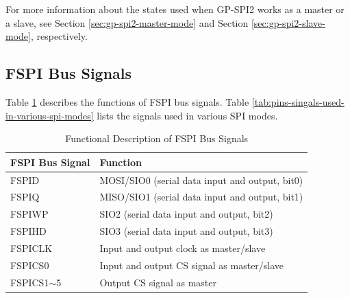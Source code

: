 \documentclass[main\_\_EN.tex]{subfiles}
\begin{document}
For more information about the states used when GP-SPI2 works as a master or a slave, see Section \ref{sec:gp-spi2-master-mode} and Section \ref{sec:gp-spi2-slave-mode}, respectively.

\subsection{FSPI Bus Signals}

Table \ref{tab:spi-signals} describes the functions of FSPI bus signals. Table \ref{tab:pins-singals-used-in-various-spi-modes} lists the signals used in various SPI modes. 


\begin{ThreePartTable}

\begin{longtable}[c]{|p{3.0cm}|l|}    
\caption{Functional Description of FSPI Bus Signals}  
\label{tab:spi-signals}\\   
\hline     
   
    \rowcolor{lightgray} 
    \textbf{FSPI Bus Signal}& \textbf{Function} \\
    \hline 
    \endfirsthead
    
    \endlastfoot
    FSPID & MOSI/SIO0 (serial data input and output, bit0) \\
    \hline
    FSPIQ & MISO/SIO1 (serial data input and output, bit1) \\\hline
    FSPIWP & SIO2 (serial data input and output, bit2) \\\hline
    FSPIHD & SIO3 (serial data input and output, bit3) \\\hline
    FSPICLK & Input and output clock as master/slave \\\hline
    FSPICS0 & Input and output CS signal as master/slave\\\hline
    FSPICS1$\sim$5 & Output CS signal as master\\\hline
\end{longtable}

\end{ThreePartTable}
\end{document}
